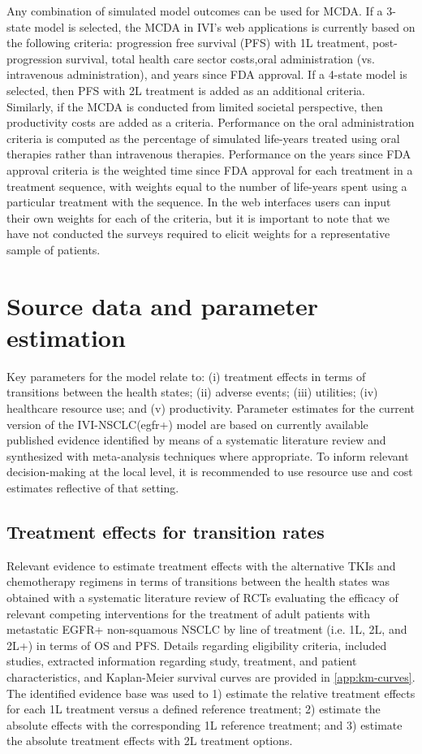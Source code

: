 \documentclass[11pt,final,fleqn]{article}\usepackage[]{graphicx}\usepackage[]{color}
\theoremstyle{plain}
\begin{document}
{Any combination of simulated model outcomes can be used for MCDA. If a 3-state model is selected, the MCDA in IVI's web applications is currently based on the following criteria: progression free survival (PFS) with 1L treatment, post-progression survival, total health care sector costs,oral administration (vs. intravenous administration), and years since FDA approval. If a 4-state model is selected, then PFS with 2L treatment is added as an additional criteria. Similarly, if the MCDA is conducted from limited societal perspective, then productivity costs are added as a criteria. Performance on the oral administration criteria is computed as the percentage of simulated life-years treated using oral therapies rather than intravenous therapies. Performance on the years since FDA approval criteria is the weighted time since FDA approval for each treatment in a treatment sequence, with weights equal to the number of life-years spent using a particular treatment with the sequence. In the web interfaces users can input their own weights for each of the criteria, but it is important to note that we have not conducted the surveys required to elicit weights for a representative sample of patients.

\section{Source data and parameter estimation}\label{sec:data}
Key parameters for the model relate to: (i) treatment effects in terms of transitions between the health states; (ii) adverse events; (iii) utilities; (iv) healthcare resource use; and (v) productivity. Parameter estimates for the current version of the IVI-NSCLC(egfr+) model are based on currently available published evidence identified by means of a systematic literature review and synthesized with meta-analysis techniques where appropriate. To inform relevant decision-making at the local level, it is recommended to use resource use and cost estimates reflective of that setting. 

\subsection{Treatment effects for transition rates} \label{subsec:data-trans-rates}
Relevant evidence to estimate treatment effects with the alternative TKIs and chemotherapy regimens in terms of transitions between the health states was obtained with a systematic literature review of RCTs evaluating the efficacy of relevant competing interventions for the treatment of adult patients with metastatic EGFR+ non-squamous NSCLC by line of treatment (i.e. 1L, 2L, and 2L+) in terms of OS and PFS. Details regarding eligibility criteria, included studies, extracted information regarding study, treatment, and patient characteristics, and Kaplan-Meier survival curves are provided in \autoref{app:km-curves}. 
The identified evidence base was used to 1) estimate the relative treatment effects for each 1L treatment versus a defined reference treatment; 2) estimate the absolute effects with the corresponding 1L reference treatment; and 3) estimate the absolute treatment effects with 2L treatment options. 

}
\end{document}

